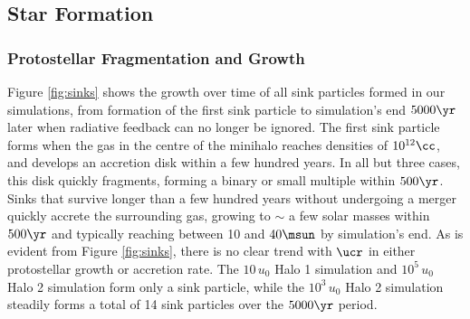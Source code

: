 \subsection{Star Formation}
\subsubsection{Protostellar Fragmentation and Growth}
\label{subsec:sink_formation}

Figure \ref{fig:sinks} shows the growth over time of all sink particles formed in our simulations, from formation of the first sink particle to simulation's end $5000\yr$ later when radiative feedback can no longer be ignored. 
The first sink particle forms when the gas in the centre of the minihalo reaches densities of $10^{12}\cc$, and develops an accretion disk within a few hundred years. 
In all but three cases, this disk quickly fragments, forming a binary or small multiple within $500\yr$. 
Sinks that survive longer than a few hundred years without undergoing a merger quickly accrete the surrounding gas, growing to $\sim$ a few solar masses within $500\yr$ and typically reaching between 10 and $40\msun$ by simulation's end.
As is evident from Figure \ref{fig:sinks}, there is no clear trend with $\ucr$ in either protostellar growth or accretion rate.
The $10\,u_0$ Halo 1 simulation and $10^5\,u_0$ Halo 2 simulation form only a sink particle, while the $10^3\,u_0$ Halo 2 simulation steadily forms a total of 14 sink particles over the $5000\yr$ period.
